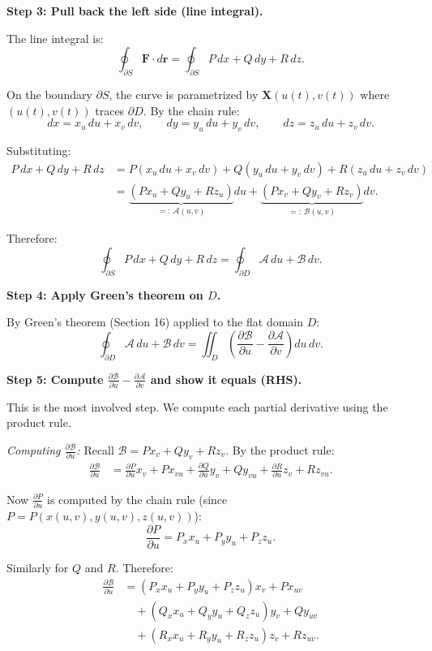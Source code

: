 \documentclass[11pt]{report}
\newcommand{\parti}[2]{\frac{\partial #1}{\partial #2}}
\begin{document}
\textbf{Step 3: Pull back the left side (line integral).}

The line integral is:
\[
\oint_{\partial S} \mathbf{F} \cdot d\mathbf{r} = \oint_{\partial S} P \, dx + Q \, dy + R \, dz.
\]

On the boundary $\partial S$, the curve is parametrized by $\mathbf{X}(u(t), v(t))$ where $(u(t), v(t))$ traces $\partial D$. By the chain rule:
\[
dx = x_u \, du + x_v \, dv, \qquad dy = y_u \, du + y_v \, dv, \qquad dz = z_u \, du + z_v \, dv.
\]

Substituting:
\begin{align*}
P \, dx + Q \, dy + R \, dz &= P(x_u \, du + x_v \, dv) + Q(y_u \, du + y_v \, dv) + R(z_u \, du + z_v \, dv) \\
&= \underbrace{(Px_u + Qy_u + Rz_u)}_{=: \, \mathcal{A}(u,v)} du + \underbrace{(Px_v + Qy_v + Rz_v)}_{=: \, \mathcal{B}(u,v)} dv.
\end{align*}

Therefore:
\[
\oint_{\partial S} P \, dx + Q \, dy + R \, dz = \oint_{\partial D} \mathcal{A} \, du + \mathcal{B} \, dv. \tag{LHS}
\]

\textbf{Step 4: Apply Green's theorem on $D$.}

By Green's theorem (Section 16) applied to the flat domain $D$:
\[
\oint_{\partial D} \mathcal{A} \, du + \mathcal{B} \, dv = \iint_D \left(\parti{\mathcal{B}}{u} - \parti{\mathcal{A}}{v}\right) du \, dv. \tag{LHS$'$}
\]

\textbf{Step 5: Compute $\parti{\mathcal{B}}{u} - \parti{\mathcal{A}}{v}$ and show it equals (RHS).}

This is the most involved step. We compute each partial derivative using the product rule.

\textit{Computing $\parti{\mathcal{B}}{u}$:} Recall $\mathcal{B} = Px_v + Qy_v + Rz_v$. By the product rule:
\begin{align*}
\parti{\mathcal{B}}{u} &= \parti{P}{u}x_v + P x_{vu} + \parti{Q}{u}y_v + Q y_{vu} + \parti{R}{u}z_v + R z_{vu}.
\end{align*}

Now $\parti{P}{u}$ is computed by the chain rule (since $P = P(x(u,v), y(u,v), z(u,v))$):
\[
\parti{P}{u} = P_x x_u + P_y y_u + P_z z_u.
\]

Similarly for $Q$ and $R$. Therefore:
\begin{align*}
\parti{\mathcal{B}}{u} &= (P_x x_u + P_y y_u + P_z z_u) x_v + P x_{uv} \\
&\quad + (Q_x x_u + Q_y y_u + Q_z z_u) y_v + Q y_{uv} \\
&\quad + (R_x x_u + R_y y_u + R_z z_u) z_v + R z_{uv}.
\end{align*}
\end{document}
